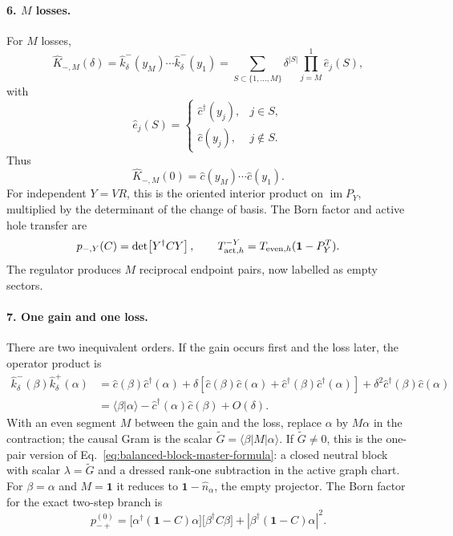 \documentclass[aps,prb,onecolumn,nofootinbib,superscriptaddress]{revtex4-2}
\newcommand{\I}{\mathbf{1}}
\theoremstyle{plain}
\theoremstyle{definition}
\begin{document}
\paragraph*{6. \(M\) losses.}
For \(M\) losses,
\begin{equation}
  \hat K_{-,M}(\delta)
  =
  \hat k_\delta^-(y_M)\cdots\hat k_\delta^-(y_1)
  =
  \sum_{S\subset\{1,\ldots,M\}}
  \delta^{|S|}
  \prod_{j=M}^{1} \hat e_j(S),
  \label{eq:M-loss-subset-expansion}
\end{equation}
with
\begin{equation}
  \hat e_j(S)=
  \begin{cases}
    \hat c^\dagger(y_j), & j\in S,\\
    \hat c(y_j), & j\notin S .
  \end{cases}
  \label{eq:M-loss-subset-operator}
\end{equation}
Thus
\begin{equation}
  \hat K_{-,M}(0)=\hat c(y_M)\cdots\hat c(y_1).
  \label{eq:M-loss-leading-word}
\end{equation}
For independent \(Y=VR\), this is the oriented interior product on
\(\operatorname{im}P_Y\), multiplied by the determinant of the change of
basis.  The Born factor and active hole transfer are
\begin{equation}
  p_{-,Y}(C)=\det\!\left[Y^\dagger C Y\right],
  \qquad
  T_{{\rm act},h}^{-Y}=T_{{\rm even},h}(\I-P_Y^T).
  \label{eq:M-loss-born-active}
\end{equation}
The regulator produces \(M\) reciprocal endpoint pairs, now labelled as empty
sectors.

\paragraph*{7. One gain and one loss.}
There are two inequivalent orders.  If the gain occurs first and the loss
later, the operator product is
\begin{align}
  \hat k_\delta^-(\beta)\hat k_\delta^+(\alpha)
  &=
  \hat c(\beta)\hat c^\dagger(\alpha)
  +\delta\!\left[
    \hat c(\beta)\hat c(\alpha)
    +\hat c^\dagger(\beta)\hat c^\dagger(\alpha)
  \right]
  +\delta^2\hat c^\dagger(\beta)\hat c(\alpha)
  \nonumber\\
  &=
  \langle\beta|\alpha\rangle
  -\hat c^\dagger(\alpha)\hat c(\beta)
  +O(\delta).
  \label{eq:causal-pair-regulated-expansion}
\end{align}
With an even segment \(M\) between the gain and the loss, replace
\(\alpha\) by \(M\alpha\) in the contraction; the causal Gram is the scalar
\(\widetilde G=\langle\beta|M|\alpha\rangle\).  If
\(\widetilde G\ne0\), this is the one-pair version of
Eq.~\eqref{eq:balanced-block-master-formula}: a closed neutral block with
scalar \(\lambda=\widetilde G\) and a dressed rank-one subtraction in the
active graph chart.  For \(\beta=\alpha\) and \(M=\I\) it reduces to
\(\I-\hat n_\alpha\), the empty projector.  The Born factor for the exact
two-step branch is
\begin{equation}
  p_{-+}^{(0)}
  =
  \bigl[\alpha^\dagger(\I-C)\alpha\bigr]
  \bigl[\beta^\dagger C\beta\bigr]
  +
  \left|\beta^\dagger(\I-C)\alpha\right|^2 .
  \label{eq:causal-pair-born}
\end{equation}
\end{document}
